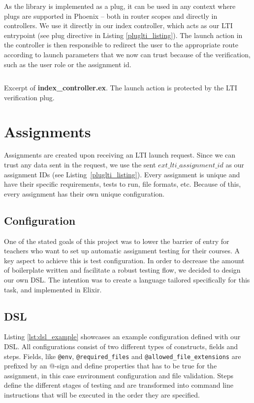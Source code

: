 As the library is implemented as a plug, it can be used in any context where plugs are supported in Phoenix -- both in router scopes and directly in controllers. We use it directly in our index controller, which acts as our LTI entrypoint (see plug directive in Listing \ref{pluglti_listing}). The launch action in the controller is then responsible to redirect the user to the appropriate route according to launch parameters that we now can trust because of the verification, such as the user role or the assignment id.

\begin{listing}
    \inputminted[firstline=8,lastline=27]{elixir}{code/server/lib/thesis_web/controllers/index_controller.ex}
    \caption{Excerpt of \textbf{index\_controller.ex}. The launch action is protected by the LTI verification plug.}
    \label{pluglti_listing}
\end{listing}

\section{Assignments}

Assignments are created upon receiving an LTI launch request. Since we can trust any data sent in the request, we use the sent $ext\_lti\_assignment\_id$ as our assignment IDs (see Listing~\ref{pluglti_listing}). Every assignment is unique and have their specific requirements, tests to run, file formats, etc. Because of this, every assignment has their own unique configuration.

\subsection{Configuration}
One of the stated goals of this project was to lower the barrier of entry for teachers who want to set up automatic assignment testing for their courses. A key aspect to achieve this is test configuration. In order to decrease the amount of boilerplate written and facilitate a robust testing flow, we decided to design our own DSL. The intention was to create a language tailored specifically for this task, and implemented in Elixir.


\subsection{DSL}
Listing \ref{lst:dsl_example} showcases an example configuration defined with our DSL. All configurations consist of two different types of constructs, fields and steps. Fields, like \texttt{@env}, \texttt{@required_files} and \texttt{@allowed_file_extensions} are prefixed by an @-sign and define properties that has to be true for the assignment, in this case environment configuration and file validation. Steps define the different stages of testing and are transformed into command line instructions that will be executed in the order they are specified.

